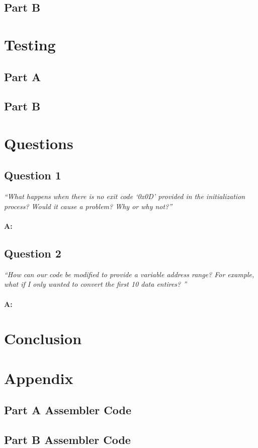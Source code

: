 \documentclass[letterpaper]{article}
\begin{document}
  \subsection{Part B}
    \lipsum[4]

\section{Testing}
  \subsection{Part A}
    \lipsum[5]

  \subsection{Part B}
    \lipsum[6]

\section{Questions}

    \subsection{Question 1}
      \textit{``What happens when there is no exit code ‘0x0D’ provided in the initialization process? Would it cause a problem? Why or why not?''}
      \\ \\
      \noindent\textbf{A:}
      \lipsum[7]

    \subsection{Question 2}
      \textit{``How can our code be modified to provide a variable address range? For example, what if I only wanted to convert the first 10 data entires? ''}
      \\ \\
      \noindent\textbf{A:}
      \lipsum[8]

\section{Conclusion}
  \lipsum[9]
  \medskip
  \lipsum[10]

\newpage
\section{Appendix}
  \subsection{Part A Assembler Code}
    
\newpage

  \subsection{Part B Assembler Code}
    
\end{document}
